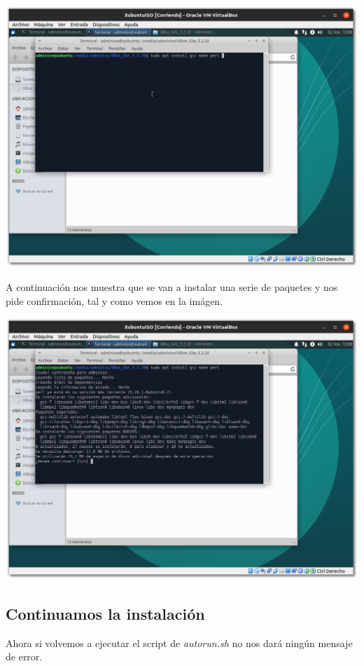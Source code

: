 \documentclass[11pt]{article}
\begin{document}
\begin{center}
\includegraphics[width=.9\linewidth]{imgs/VBox_GuestAdd_LinuX_020.png}
\end{center}

A continuación nos muestra que se van a instalar una serie de paquetes y
nos pide confirmación, tal y como vemos en la imágen.

\begin{center}
\includegraphics[width=.9\linewidth]{imgs/VBox_GuestAdd_LinuX_021.png}
\end{center}

\subsection{Continuamos la instalación}
\label{sec:orgac405c8}
Ahora si volvemos a ejecutar el script de \emph{autorun.sh} no nos dará
ningún mensaje de error.
\end{document}
